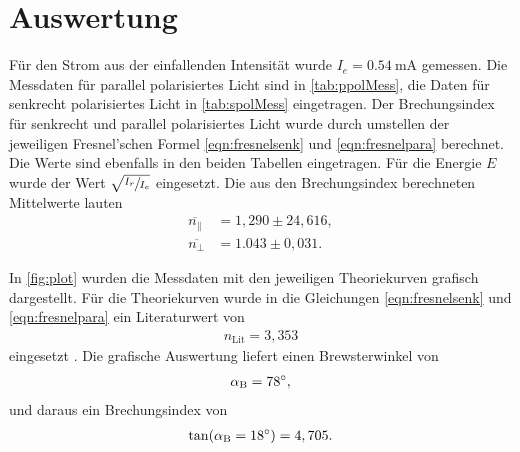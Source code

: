 \section{Auswertung}
\label{sec:Auswertung}

Für den Strom aus der einfallenden Intensität wurde $I_e = \SI{0,54}{\milli\ampere}$ gemessen. Die Messdaten für parallel polarisiertes Licht sind in
\autoref{tab:ppolMess}, die Daten für senkrecht polarisiertes Licht in \autoref{tab:spolMess} eingetragen. Der Brechungsindex für senkrecht und parallel
polarisiertes Licht wurde durch umstellen der jeweiligen Fresnel'schen Formel \eqref{eqn:fresnelsenk} und \eqref{eqn:fresnelpara} berechnet. Die Werte sind ebenfalls in den beiden Tabellen eingetragen.
Für die Energie $E$ wurde der Wert $\sqrt{\sfrac{I_r}{I_e}}$ eingesetzt.
Die aus den Brechungsindex berechneten Mittelwerte lauten
\begin{align*}
    \overline{n_\parallel} &= 1,290 \pm 24,616, \\
    \overline{n_\perp} &= 1.043 \pm 0,031.
\end{align*}

\noindent
In \autoref{fig:plot} wurden die Messdaten mit den jeweiligen Theoriekurven grafisch dargestellt. Für die Theoriekurven wurde in die Gleichungen \eqref{eqn:fresnelsenk} und \eqref{eqn:fresnelpara}
ein Literaturwert von
\begin{align*}
    n_{\text{Lit}} = 3,353
\end{align*}
eingesetzt \cite{BrechSilizium}. Die grafische Auswertung liefert einen Brewsterwinkel von  
\begin{align*}
    \alpha_{\text B} = \SI{78}{\degree},
\end{align*}
und daraus ein Brechungsindex von 
\begin{align*}
    \tan(\alpha_{\text B} = \SI{18}{\degree}) = 4,705.
\end{align*}


